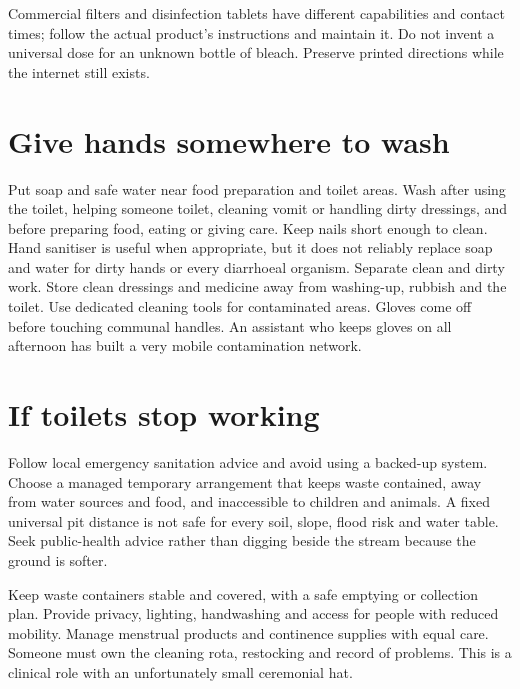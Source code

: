 \documentclass[10pt,openright]{book}
\begin{document}
Commercial filters and disinfection tablets have different capabilities and contact times; follow the actual product's instructions and maintain it. Do not invent a universal dose for an unknown bottle of bleach. Preserve printed directions while the internet still exists.

\section*{Give hands somewhere to wash}
Put soap and safe water near food preparation and toilet areas. Wash after using the toilet, helping someone toilet, cleaning vomit or handling dirty dressings, and before preparing food, eating or giving care. Keep nails short enough to clean. Hand sanitiser is useful when appropriate, but it does not reliably replace soap and water for dirty hands or every diarrhoeal organism. Separate clean and dirty work. Store clean dressings and medicine away from washing-up, rubbish and the toilet. Use dedicated cleaning tools for contaminated areas. Gloves come off before touching communal handles. An assistant who keeps gloves on all afternoon has built a very mobile contamination network.

\section*{If toilets stop working}
Follow local emergency sanitation advice and avoid using a backed-up system. Choose a managed temporary arrangement that keeps waste contained, away from water sources and food, and inaccessible to children and animals. A fixed universal pit distance is not safe for every soil, slope, flood risk and water table. Seek public-health advice rather than digging beside the stream because the ground is softer.

Keep waste containers stable and covered, with a safe emptying or collection plan. Provide privacy, lighting, handwashing and access for people with reduced mobility. Manage menstrual products and continence supplies with equal care. Someone must own the cleaning rota, restocking and record of problems. This is a clinical role with an unfortunately small ceremonial hat.
\end{document}
